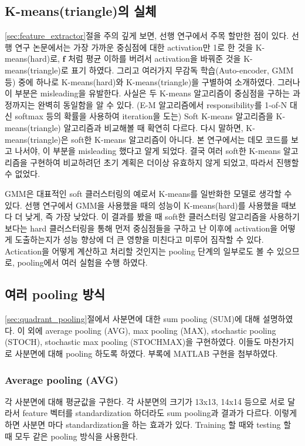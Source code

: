 \documentclass[a4paper,9pt]{article}
\begin{document}
\begin{multicols*}{2}
\subsection{K-means(triangle)의 실체}

\ref{sec:feature_extractor}절을 주의 깊게 보면, 선행 연구에서 주목 할만한 점이 있다.
선행 연구 논문에서는 가장 가까운 중심점에 대한 activation만 1로 한 것을 K-means(hard)로, $\mathbf{f}$ 처럼 평균 이하를 버려서 activation을 바꿔준 것을 K-means(triangle)로 표기 하였다.
그리고 여러가지 무감독 학습(Auto-encoder, GMM 등) 중에 하나로 K-means(hard)와 K-means(triangle)을 구별하여 소개하였다.
그러나 이 부분은 misleading을 유발한다.
사실은 두 K-means 알고리즘이 중심점을 구하는 과정까지는 완벽히 동일함을 알 수 있다.
(E-M 알고리즘에서 responsibility를 1-of-N 대신 softmax 등의 확률을 사용하여 iteration을 도는) Soft K-means 알고리즘을 K-means(triangle) 알고리즘과 비교해볼 때 확연히 다르다.
다시 말하면, K-means(triangle)은 soft한 K-means 알고리즘이 아니다.
본 연구에서는 데모 코드를 보고 나서야, 이 부분을 misleading 했다고 알게 되었다.
결국 여러 soft한 K-means 알고리즘을 구현하여 비교하려던 초기 계획은 더이상 유효하지 않게 되었고, 따라서 진행할 수 없었다.

GMM은 대표적인 soft 클러스터링의 예로서 K-means를 일반화한 모델로 생각할 수 있다.
선행 연구에서 GMM을 사용했을 때의 성능이 K-means(hard)를 사용했을 때보다 더 낮게, 즉 가장 낮았다.
이 결과를 봤을 때 soft한 클러스터링 알고리즘을 사용하기 보다는 hard 클러스터링을 통해 먼저 중심점들을 구하고 난 이후에 activation을 어떻게 도출하는지가 성능 향상에 더 큰 영향을 미친다고 미루어 짐작할 수 있다.
Actication을 어떻게 계산하고 처리할 것인지는 pooling 단계의 일부로도 볼 수 있으므로, pooling에서 여러 실험을 수행 하였다.

\subsection{여러 pooling 방식}

\ref{sec:quadrant_pooling}절에서 사분면에 대한 sum pooling (SUM)에 대해 설명하였다.
이 외에 average pooling (AVG), max pooling (MAX), stochastic pooling (STOCH), stochastic max pooling (STOCHMAX)을 구현하였다.
이들도 마찬가지로 사분면에 대해 pooling 하도록 하였다.
부록에 MATLAB 구현을 첨부하였다.

\subsubsection{Average pooling (AVG)}

각 사분면에 대해 평균값을 구한다.
각 사분면의 크기가 13x13, 14x14 등으로 서로 달라서 feature 벡터를 standardization 하더라도 sum pooling과 결과가 다르다.
이렇게 하면 사분면 마다 standardization을 하는 효과가 있다.
Training 할 때와 testing 할 때 모두 같은 pooling 방식을 사용한다.


\end{multicols*}
\end{document}
